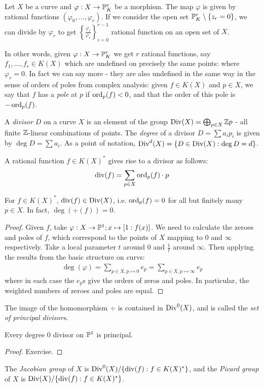 \documentclass[10pt,a4paper,rgb]{article}
\begin{document}
Let $X$ be a curve and $\varphi:X \to \P^r_K$ be a morphism. The map $\varphi$ is given by rational functions $(\varphi_0, \ldots, \varphi_r)$. If we consider the open set $\P^r_K\setminus \{z_r = 0\}$, we can divide by $\varphi_r$ to get $\left\{\frac{\varphi_i}{\varphi_r}\right\}_{i=0}^{r-1}$ rational function on an open set of $X$.

In other words, given $\varphi:X \to \P^r_K$ we get $r$ rational functions, say $f_1, \ldots, f_r \in K(X)$ which are undefined on precisely the same points: where $\varphi_r = 0$. In fact we can say more - they are also undefined in the same way in the sense of orders of poles from complex analysis: given $f \in K(X)$ and $p \in X$, we say that $f$ has a \emph{pole} at $p$ if $\ord_p(f) < 0$, and that the order of this pole is $-\ord_p(f)$.

A \emph{divisor} $D$ on a curve $X$ is an element of the group $\Div(X) = \bigoplus_{p \in X}\Z p$ - all finite $\Z$-linear combinations of points. The \emph{degree} of a divisor $D = \sum a_i p_i$ is given by $\deg D = \sum a_i$. As a point of notation, $\Div^d(X) = \{D \in \Div(X) : \deg D = d\}$.

A rational function $f \in K(X)^{\ast}$ gives rise to a divisor as follows:
\begin{align*}
\div(f) = \sum_{p\in X} \ord_p(f) \cdot p
\end{align*}
\begin{lemma}
For $f \in K(X)^{\ast}$, $\div(f) \in \Div(X)$, i.e. $\ord_p(f) = 0$ for all but finitely many $p \in X$. In fact, $\deg(\div(f)) = 0$.
\end{lemma}
\begin{proof}
Given $f$, take $\varphi: X \to \P^1; x\mapsto [1:f(x)]$. We need to calculate the zeroes and poles of $f$, which correspond to the points of $X$ mapping to $0$ and $\infty$ respectively. Take a local parameter $t$ around $0$ and $\frac1t$ around $\infty$. Then applying the results from the basic structure on curvs:
\begin{align*}
\deg(\varphi) = \sum_{p\in X, p \mapsto 0} e_p = \sum_{p \in X, p \mapsto \infty} e_p
\end{align*}
where in each case the $e_p$s give the orders of zeros and poles.  In particular, the weighted numbers of zeroes and poles are equal.
\end{proof}
The image of the homomorphism $\div$ is contained in $\Div^0(X)$, and is called the \emph{set of principal divisors}.
\begin{proposition}
Every degree 0 divisor on $\P^1$ is principal.
\end{proposition}
\begin{proof}
Exercise.
\end{proof}
The \emph{Jacobian group} of $X$ is $\Div^0(X)/\{\div(f):f\in K(X)^{\ast}\}$, and the \emph{Picard group} of $X$ is $\Div(X)/\{\div(f): f \in K(X)^{\ast}\}$.
\end{document}
